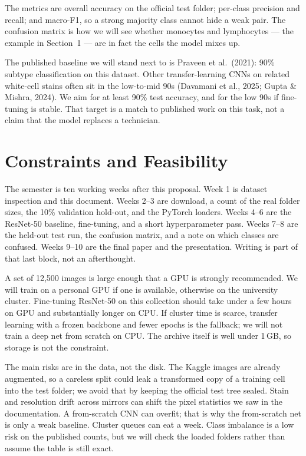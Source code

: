 \documentclass[11pt]{article}
\begin{document}
The metrics are overall accuracy on the official test folder; per-class precision and recall; and macro-F1, so a strong majority class cannot hide a weak pair. The confusion matrix is how we will see whether monocytes and lymphocytes --- the example in Section~1 --- are in fact the cells the model mixes up.

The published baseline we will stand next to is Praveen et al.\ (2021): 90\% subtype classification on this dataset. Other transfer-learning CNNs on related white-cell stains often sit in the low-to-mid 90s (Davamani et al., 2025; Gupta \& Mishra, 2024). We aim for at least 90\% test accuracy, and for the low 90s if fine-tuning is stable. That target is a match to published work on this task, not a claim that the model replaces a technician.

\section{Constraints and Feasibility}

The semester is ten working weeks after this proposal. Week 1 is dataset inspection and this document. Weeks 2--3 are download, a count of the real folder sizes, the 10\% validation hold-out, and the PyTorch loaders. Weeks 4--6 are the ResNet-50 baseline, fine-tuning, and a short hyperparameter pass. Weeks 7--8 are the held-out test run, the confusion matrix, and a note on which classes are confused. Weeks 9--10 are the final paper and the presentation. Writing is part of that last block, not an afterthought.

A set of 12{,}500 images is large enough that a GPU is strongly recommended. We will train on a personal GPU if one is available, otherwise on the university cluster. Fine-tuning ResNet-50 on this collection should take under a few hours on GPU and substantially longer on CPU. If cluster time is scarce, transfer learning with a frozen backbone and fewer epochs is the fallback; we will not train a deep net from scratch on CPU. The archive itself is well under 1\,GB, so storage is not the constraint.

The main risks are in the data, not the disk. The Kaggle images are already augmented, so a careless split could leak a transformed copy of a training cell into the test folder; we avoid that by keeping the official test tree sealed. Stain and resolution drift across mirrors can shift the pixel statistics we saw in the documentation. A from-scratch CNN can overfit; that is why the from-scratch net is only a weak baseline. Cluster queues can eat a week. Class imbalance is a low risk on the published counts, but we will check the loaded folders rather than assume the table is still exact.
\end{document}
